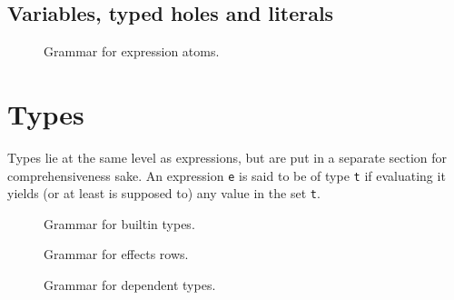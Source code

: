 \subsection{Variables, typed holes and literals}\label{subsec:zilch-grammar-expressions-basicexpr}

\begin{figure}[H]
	\centering


	\caption{Grammar for expression atoms.}
	\label{fig:zilch-grammar-expressions-atom-grammar}
\end{figure}

\section{Types}\label{sec:zilch-grammar-types}

Types lie at the same level as expressions, but are put in a separate section for comprehensiveness sake.
An expression \verb|e| is said to be of type \verb|t| if evaluating it yields (or at least is supposed to) any value in the set \verb|t|.

\begin{figure}[H]
	\centering


	\caption{Grammar for builtin types.}
	\label{fig:zilch-grammar-types-builtin-grammar}
\end{figure}

\begin{figure}[H]
	\centering


	\caption{Grammar for effects rows.}
	\label{fig:zilch-grammar-types-effectrow-grammar}
\end{figure}

\begin{figure}[H]
	\centering


	\caption{Grammar for dependent types.}
	\label{fig:zilch-grammar-types-dependent-grammar}
\end{figure}

